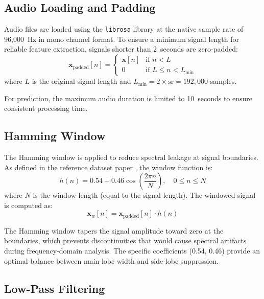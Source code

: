 \documentclass[12pt,a4paper]{report}
\begin{document}
\subsection{Audio Loading and Padding}

Audio files are loaded using the \texttt{librosa} library at the native sample rate of 96,000~Hz in mono channel format. To ensure a minimum signal length for reliable feature extraction, signals shorter than 2~seconds are zero-padded:
\begin{equation}
    \mathbf{x}_{\text{padded}}[n] = \begin{cases}
        \mathbf{x}[n] & \text{if } n < L \\
        0 & \text{if } L \leq n < L_{\min}
    \end{cases}
\end{equation}
where $L$ is the original signal length and $L_{\min} = 2 \times \text{sr} = 192{,}000$ samples.

For prediction, the maximum audio duration is limited to 10~seconds to ensure consistent processing time.

\subsection{Hamming Window}

The Hamming window is applied to reduce spectral leakage at signal boundaries. As defined in the reference dataset paper \cite{datainbrief2023}, the window function is:
\begin{equation}
    h(n) = 0.54 + 0.46 \cos\left(\frac{2\pi n}{N}\right), \quad 0 \leq n \leq N
\label{eq:hamming}
\end{equation}
where $N$ is the window length (equal to the signal length). The windowed signal is computed as:
\begin{equation}
    \mathbf{x}_w[n] = \mathbf{x}_{\text{padded}}[n] \cdot h(n)
\end{equation}

The Hamming window tapers the signal amplitude toward zero at the boundaries, which prevents discontinuities that would cause spectral artifacts during frequency-domain analysis. The specific coefficients (0.54, 0.46) provide an optimal balance between main-lobe width and side-lobe suppression.

\subsection{Low-Pass Filtering}
\end{document}
